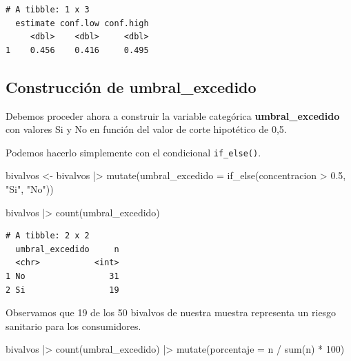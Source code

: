 \documentclass[
  spanish,
  a4paper,
]{scrbook}
\newenvironment{Shaded}{\begin{snugshade}}{\end{snugshade}}
\newcommand{\AttributeTok}[1]{\textcolor[rgb]{0.40,0.45,0.13}{#1}}
\newcommand{\DecValTok}[1]{\textcolor[rgb]{0.68,0.00,0.00}{#1}}
\newcommand{\FloatTok}[1]{\textcolor[rgb]{0.68,0.00,0.00}{#1}}
\newcommand{\FunctionTok}[1]{\textcolor[rgb]{0.28,0.35,0.67}{#1}}
\newcommand{\NormalTok}[1]{\textcolor[rgb]{0.00,0.23,0.31}{#1}}
\newcommand{\OtherTok}[1]{\textcolor[rgb]{0.00,0.23,0.31}{#1}}
\newcommand{\SpecialCharTok}[1]{\textcolor[rgb]{0.37,0.37,0.37}{#1}}
\newcommand{\StringTok}[1]{\textcolor[rgb]{0.13,0.47,0.30}{#1}}
\begin{document}
\begin{verbatim}
# A tibble: 1 x 3
  estimate conf.low conf.high
     <dbl>    <dbl>     <dbl>
1    0.456    0.416     0.495
\end{verbatim}

\subsection{\texorpdfstring{Construcción de
\textbf{umbral\_excedido}}{Construcción de umbral\_excedido}}\label{construcciuxf3n-de-umbral_excedido}

Debemos proceder ahora a construir la variable categórica
\textbf{umbral\_excedido} con valores Si y No en función del valor de
corte hipotético de 0,5.

Podemos hacerlo simplemente con el condicional \texttt{if\_else()}.

\begin{Shaded}
\begin{Highlighting}[]
\NormalTok{bivalvos }\OtherTok{\textless{}{-}}\NormalTok{ bivalvos }\SpecialCharTok{|\textgreater{}}
  \FunctionTok{mutate}\NormalTok{(}\AttributeTok{umbral\_excedido =} \FunctionTok{if\_else}\NormalTok{(concentracion }\SpecialCharTok{\textgreater{}} \FloatTok{0.5}\NormalTok{, }\StringTok{"Si"}\NormalTok{, }\StringTok{"No"}\NormalTok{))}

\NormalTok{bivalvos }\SpecialCharTok{|\textgreater{}}
  \FunctionTok{count}\NormalTok{(umbral\_excedido)}
\end{Highlighting}
\end{Shaded}

\begin{verbatim}
# A tibble: 2 x 2
  umbral_excedido     n
  <chr>           <int>
1 No                 31
2 Si                 19
\end{verbatim}

Observamos que 19 de los 50 bivalvos de nuestra muestra representa un
riesgo sanitario para los consumidores.

\begin{Shaded}
\begin{Highlighting}[]
\NormalTok{bivalvos }\SpecialCharTok{|\textgreater{}}
  \FunctionTok{count}\NormalTok{(umbral\_excedido) }\SpecialCharTok{|\textgreater{}}
  \FunctionTok{mutate}\NormalTok{(}\AttributeTok{porcentaje =}\NormalTok{ n }\SpecialCharTok{/} \FunctionTok{sum}\NormalTok{(n) }\SpecialCharTok{*} \DecValTok{100}\NormalTok{)}
\end{Highlighting}
\end{Shaded}
\end{document}
